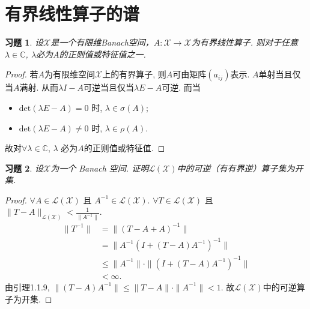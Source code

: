 \documentclass[UTF8,twoside]{ctexbook}
\newtheorem{exercise}{习题}[section]
\newcommand{\h}{\mathscr}
\numberwithin{equation}{section}
\newcommand{\lx}{\mathscr L (\mathscr X)}
\begin{document}
	\section{有界线性算子的谱}
	\begin{exercise}
		设$\h X$是一个有限维Banach空间，$A: \h X \rightarrow \h X$为有界线性算子. 则对于任意$\lambda \in \mathbb C$, $\lambda$必为$A$的正则值或特征值之一.
	\end{exercise}
	\begin{proof}
		若$A$为有限维空间$\h X$上的有界算子, 则$A$可由矩阵$(a_{ij})$表示. $A$单射当且仅当$A$满射. 从而$\lambda I-A $可逆当且仅当$\lambda E-A$可逆. 而当
		\begin{itemize}
			\item $\text{det}(\lambda E-A)=0$ 时, $\lambda\in\sigma(A)$;
			\item $\text{det}(\lambda E-A)\neq0$ 时, $\lambda\in\rho(A)$.
		\end{itemize}
		故对$\forall\lambda\in\mathbb C$, $\lambda$ 必为$A$的正则值或特征值.
	\end{proof}
	\begin{exercise}
		设$\h X$为一个 Banach 空间. 证明$\h L(\h X)$中的可逆（有有界逆）算子集为开集.
	\end{exercise}
	\begin{proof}
		$\forall A \in \h L(\h X)$ 且 $A^{-1}\in\h L(\h X)$. $\forall T\in \h L(\h X)$ 且 $\| T-A\|_{\lx}<\frac{1}{\|A^{-1}\|}$.
		\begin{align*}
		\| T^{-1}\| &= \| (T-A+A)^{-1} \| \\
		&=\| A^{-1}(I+(T-A)A^{-1})^{-1}  \| \\
		&\leq \| A^{-1} \|\cdot \|(I + (T-A)A^{-1})^{-1}\| \\
		&<\infty.
		\end{align*}
		由引理1.1.9, $\| (T-A)A^{-1} \|\leq \| T-A \|\cdot \| A^{-1} \|<1.$ 故$\lx$中的可逆算子为开集.
	\end{proof}
\end{document}
